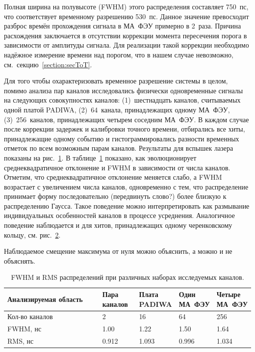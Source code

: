 Полная ширина на полувысоте (FWHM) этого распределения составляет 750~пс, что соответствует временному разрешению 530~пс. Данное значение превосходит разброс времён прохождения сигнала в МА~ФЭУ примерно в 2~раза. Причина расхождения заключается в отсутствии коррекции момента пересечения порога в зависимости от амплитуды сигнала. Для реализации такой коррекции необходимо надёжное измерение времени над порогом, что в нашем случае невозможно, см.~секцию~\ref{section:secToT}.

Для того чтобы охарактеризовать временное разрешение системы в целом, помимо анализа пар каналов исследовались физически одновременные сигналы на следующих совокупностях каналов: (1)~шестнадцать каналов, считываемых одной платой PADIWA, (2)~64~канала, принадлежащих одному МА~ФЭУ, (3)~256~каналов, принадлежащих четырем соседним МА~ФЭУ. В каждом случае после коррекции задержек и калибровки точного времени, отбирались все хиты, принадлежащие одному событию и гистограммировались разности временных отметок по всем возможным парам каналов. Результаты для вспышек лазера показаны на рис.~\ref{fig:TimeResEvolutionLaser}. В таблице~\ref{tabl:EvolutionParams} показано, как эволюционирует среднеквадратичное отклонение и FWHM в зависимости от числа каналов.
Отметим, что среднеквадратичное отклонение меняется слабо, а FWHM возрастает с увеличением числа каналов, одновременно с тем, что распределение принимает форму последовательно (передвинуть слово?) более близкую к распределению Гаусса. Такое поведение можно интерпретировать как размывание индивидуальных особенностей каналов в процессе усреднения. Аналогичное поведение наблюдается и для хитов, принадлежащих одному черенковскому кольцу, см. рис.~\ref{fig:TimeResEvolutionRings}.

Наблюдаемое смещение максимума от нуля можно объяснить, а можно и не объяснять.

\begin{figure}
\label{fig:TimeResEvolutionLaser}
\end{figure}

\begin{figure}
\label{fig:TimeResEvolutionRings}
\end{figure}

\begin{table}[h]
\caption{FWHM и RMS распределений при различных наборах исследуемых каналов.}
\label{tabl:EvolutionParams}
\begin{tabular}{ | p{0.4\linewidth} | p{0.15\linewidth} | p{0.15\linewidth} | p{0.15\linewidth} | p{0.15\linewidth} | }
	\hline
	Анализируемая область & Пара каналов & Плата PADIWA & Один МА~ФЭУ & Четыре МА~ФЭУ \\
	\hline
	Кол-во каналов & 2 & 16 & 64 & 256 \\
	\hline
	FWHM, нс & 1.00 & 1.22 & 1.50 & 1.64 \\
	\hline
	RMS, нс & 0.912 & 1.093 & 0.996 & 1.034 \\
	\hline
\end{tabular}
\end{table}
